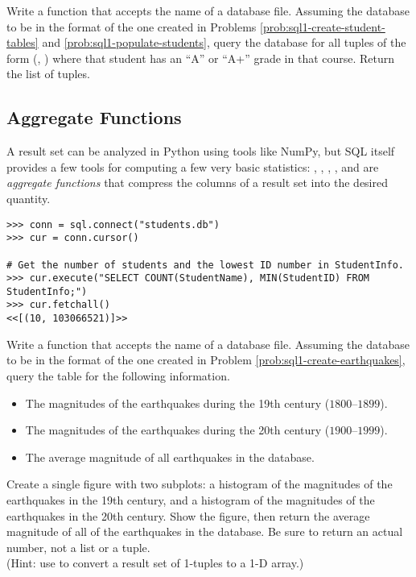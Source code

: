\begin{problem} %
Write a function that accepts the name of a database file.
Assuming the database to be in the format of the one created in Problems \ref{prob:sql1-create-student-tables} and \ref{prob:sql1-populate-students}, query the database for all tuples of the form (, ) where that student has an ``A'' or ``A+'' grade in that course.
Return the list of tuples.
\end{problem}

\subsection*{Aggregate Functions} %

A result set can be analyzed in Python using tools like NumPy, but SQL itself provides a few tools for computing a few very basic statistics: , , , , and  are \emph{aggregate functions} that compress the columns of a result set into the desired quantity.

\begin{lstlisting}
>>> conn = sql.connect("students.db")
>>> cur = conn.cursor()

# Get the number of students and the lowest ID number in StudentInfo.
>>> cur.execute("SELECT COUNT(StudentName), MIN(StudentID) FROM StudentInfo;")
>>> cur.fetchall()
<<[(10, 103066521)]>>
\end{lstlisting}

\begin{problem}
Write a function that accepts the name of a database file.
Assuming the database to be in the format of the one created in Problem \ref{prob:sql1-create-earthquakes}, query the  table for the following information.
\begin{itemize}
    \item The magnitudes of the earthquakes during the 19th century ($1800$--$1899$).
    \item The magnitudes of the earthquakes during the 20th century ($1900$--$1999$).
    \item The average magnitude of all earthquakes in the database.
\end{itemize}
Create a single figure with two subplots: a histogram of the magnitudes of the earthquakes in the 19th century, and a histogram of the magnitudes of the earthquakes in the 20th century.
Show the figure, then return the average magnitude of all of the earthquakes in the database.
Be sure to return an actual number, not a list or a tuple.
\\(Hint: use  to convert a result set of 1-tuples to a 1-D array.)
\label{prob:sql1-earthquake-analysis}
\end{problem}

